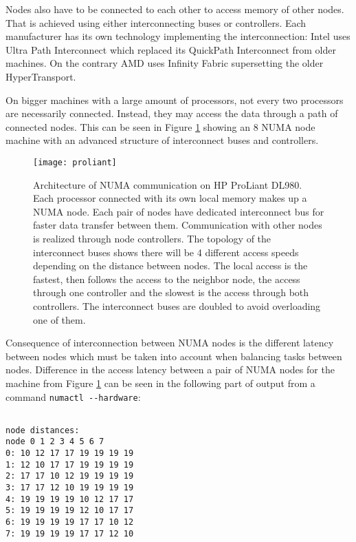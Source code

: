 Nodes also have to be connected to each other to access memory of other
nodes. That is achieved using either interconnecting buses or controllers. Each
manufacturer has its own technology implementing the interconnection: Intel uses
Ultra Path Interconnect which replaced its QuickPath Interconnect from older
machines. On the contrary AMD uses Infinity Fabric supersetting the older
HyperTransport.

On bigger machines with a large amount of processors, not every two processors
are necessarily connected. Instead, they may access the data through a path
of connected nodes. This can be seen in Figure \ref{fig:proliant} showing an 8
NUMA node machine with an advanced structure of interconnect buses and
controllers.

\begin{figure}
  \centering
  \texttt{[image: proliant]}
  \caption{Architecture of NUMA communication on HP ProLiant
    DL980\;\cite{proliant}. Each processor connected with its own local memory
    makes up a NUMA node. Each pair of nodes have dedicated interconnect bus for
    faster data transfer between them. Communication with other nodes is
    realized through node controllers. The topology of the interconnect buses
    shows there will be 4 different access speeds depending on the distance
    between nodes. The local access is the fastest, then follows the access to
    the neighbor node, the access through one controller and the slowest is the
    access through both controllers. The interconnect buses are doubled to avoid
    overloading one of them.}
  \label{fig:proliant}
\end{figure}

Consequence of interconnection between NUMA nodes is the different latency
between nodes which must be taken into account when balancing tasks between
nodes. Difference in the access latency between a pair of NUMA nodes for the
machine from Figure \ref{fig:proliant} can be seen in the following part of
output from a command \verb|numactl --hardware|:

\begin{minipage}{\linewidth}
\begin{verbatim}

node distances:
node 0 1 2 3 4 5 6 7
0: 10 12 17 17 19 19 19 19
1: 12 10 17 17 19 19 19 19
2: 17 17 10 12 19 19 19 19
3: 17 17 12 10 19 19 19 19
4: 19 19 19 19 10 12 17 17
5: 19 19 19 19 12 10 17 17
6: 19 19 19 19 17 17 10 12
7: 19 19 19 19 17 17 12 10
\end{verbatim}
\end{minipage}\\

